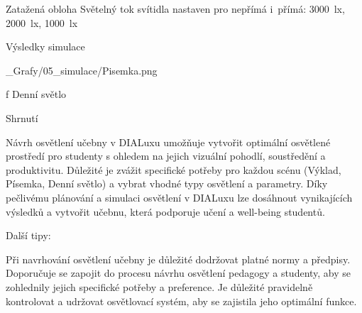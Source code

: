 \noindent Zatažená obloha
\noindent Světelný tok svítidla nastaven pro nepřímá i~přímá: 3000~lx, 2000~lx, 1000~lx

\secc Výsledky simulace

\medskip {}
\picw=10cm _Grafy/05_simulace/Pisemka.png
\caption/f Denní světlo
\medskip




\secc Shrnutí

Návrh osvětlení učebny v DIALuxu umožňuje vytvořit optimální osvětlené prostředí pro studenty s ohledem na jejich
vizuální pohodlí, soustředění a produktivitu. Důležité je zvážit specifické potřeby pro každou scénu
(Výklad, Písemka, Denní světlo) a vybrat vhodné typy osvětlení a parametry. Díky pečlivému plánování
a simulaci osvětlení v DIALuxu lze dosáhnout vynikajících výsledků a vytvořit učebnu, která podporuje učení a well-being studentů.

Další tipy:

Při navrhování osvětlení učebny je důležité dodržovat platné normy a předpisy.
Doporučuje se zapojit do procesu návrhu osvětlení pedagogy a studenty, aby se zohlednily jejich specifické potřeby a preference.
Je důležité pravidelně kontrolovat a udržovat osvětlovací systém, aby se zajistila jeho optimální funkce.


